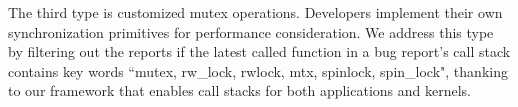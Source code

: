 

The third type is customized mutex operations. Developers implement their own
synchronization primitives for performance consideration. We address this type by
filtering
out the reports if the latest called function in a bug report's call stack
contains key words ``mutex, rw\_lock, rwlock, mtx, spinlock, spin\_lock",
thanking to our \xxx framework that enables call stacks for both applications
and kernels.






